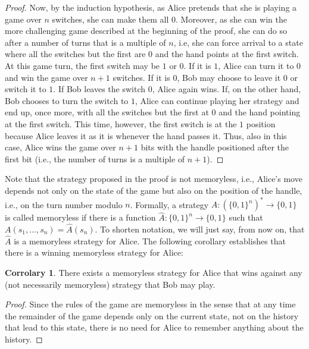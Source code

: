 \documentclass[final,12pt]{elsarticle}
\theoremstyle{definition} \newtheorem{definition}[theorem]{Definition} \newtheorem{observation}[theorem]{Observation} \newtheorem{example}[theorem]{Example} \newtheorem{remark}[theorem]{Remark} \newtheorem{corrolary}[theorem]{Corrolary}
\begin{document}
\begin{proof}
	Now, by the induction hypothesis, as Alice pretends that she is playing a game over $n$ switches, she can make them all $0$. Moreover, as she can win the more challenging game described at the beginning of the proof, she can do so after a number of turns that is a multiple of $n$, i.e, she can force arrival to a state where all the switches but the first are $0$ and the hand points at the first switch. At this game turn, the first switch may be $1$ or $0$. If it is $1$, Alice can turn it to $0$ and win the game over $n+1$ switches. If it is $0$, Bob may choose to leave it $0$ or switch it to $1$. If Bob leaves the switch $0$, Alice again wins. If, on the other hand, Bob chooses to turn the switch to $1$, Alice can continue playing her strategy and end up, once more, with all the switches but the first at $0$ and the hand pointing at the first switch. This time, however, the first switch is at the $1$ position because Alice leaves it as it is whenever the hand passes it. Thus, also in this case, Alice wins the game over $n+1$ bits with the handle positioned after the first bit (i.e., the number of turns is a multiple of $n+1$).
\end{proof}

Note that the strategy proposed in the proof is not memoryless, i.e., Alice's move depends not only on the state of the game but also on the position of the handle, i.e., on the turn number modulo $n$. Formally, a strategy $A \colon(\{0,1\}^n)^* \to \{0,1\}$ is called memoryless if there is a function $\hat{A} \colon \{0,1\}^n \to\{0,1\}$ such that $A(s_1,\dots,s_n)= \hat{A}(s_n)$. To shorten notation, we will just say, from now on, that $\hat{A}$ is a memoryless strategy for Alice. The following corollary establishes that there is a winning memoryless strategy for Alice:

\begin{corrolary}
	There exists a memoryless strategy for Alice that wins against any (not necessarily memoryless) strategy that Bob may play.
	\label{cor:memoryless}
\end{corrolary}
\begin{proof}
	Since the rules of the game are memoryless in the sense that at any time the remainder of the game depends only on the current state, not on the history that lead to this state, there is no need for Alice to remember anything about the history. 
\end{proof}
\end{document}
